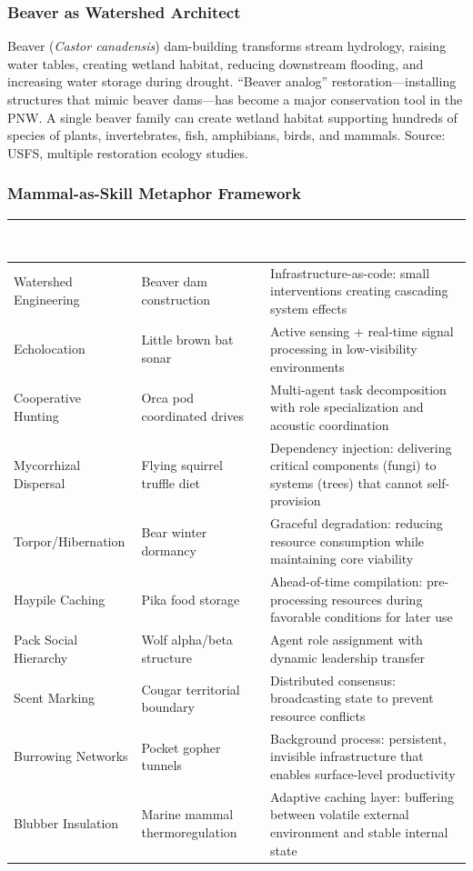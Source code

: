 \documentclass[11pt,letterpaper]{article}
\newcommand{\tableheader}[1]{\textbf{\sffamily\textcolor{white}{#1}}}
\begin{document}
\subsubsection{Beaver as Watershed Architect}
Beaver (\textit{Castor canadensis}) dam-building transforms stream hydrology, raising water tables, creating wetland habitat, reducing downstream flooding, and increasing water storage during drought. ``Beaver analog'' restoration---installing structures that mimic beaver dams---has become a major conservation tool in the PNW. A single beaver family can create wetland habitat supporting hundreds of species of plants, invertebrates, fish, amphibians, birds, and mammals. Source: USFS, multiple restoration ecology studies.

\subsubsection{Mammal-as-Skill Metaphor Framework}

\begin{center}
\begin{tabularx}{\textwidth}{L{3cm}L{3.5cm}X}
\toprule
{}
\tableheader{Adaptation} & \tableheader{Mammal Example} & \tableheader{Skill-Creator Pattern} \\
\midrule
Watershed Engineering & Beaver dam construction & Infrastructure-as-code: small interventions creating cascading system effects \\
Echolocation & Little brown bat sonar & Active sensing + real-time signal processing in low-visibility environments \\
Cooperative Hunting & Orca pod coordinated drives & Multi-agent task decomposition with role specialization and acoustic coordination \\
Mycorrhizal Dispersal & Flying squirrel truffle diet & Dependency injection: delivering critical components (fungi) to systems (trees) that cannot self-provision \\
Torpor/Hibernation & Bear winter dormancy & Graceful degradation: reducing resource consumption while maintaining core viability \\
Haypile Caching & Pika food storage & Ahead-of-time compilation: pre-processing resources during favorable conditions for later use \\
Pack Social Hierarchy & Wolf alpha/beta structure & Agent role assignment with dynamic leadership transfer \\
Scent Marking & Cougar territorial boundary & Distributed consensus: broadcasting state to prevent resource conflicts \\
Burrowing Networks & Pocket gopher tunnels & Background process: persistent, invisible infrastructure that enables surface-level productivity \\
Blubber Insulation & Marine mammal thermoregulation & Adaptive caching layer: buffering between volatile external environment and stable internal state \\
\bottomrule
\end{tabularx}
\end{center}
\end{document}

